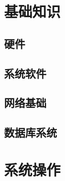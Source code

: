 \documentclass[11pt,a4paper]{report}
\title{\sffamily \bookname}
\author{李明哲}
\date{\today}
\begin{document}
\maketitle
{}
\tableofcontents
\listoffigures
\listoftables

\titleformat{\section}{\large\raggedright\sffamily}{\thesection}{1em}{}
\titleformat{\subsection}{\normalfont\raggedright\sffamily}{\thesubsection}{1em}{}
\titleformat{\subsubsection}{\normalfont\raggedright\sffamily}{\thesubsubsection}{1em}{}

\part{基础知识}
\chapter{硬件}

\chapter{系统软件}

\chapter{网络基础}

\chapter{数据库系统}


\part{系统操作}
\end{document}
